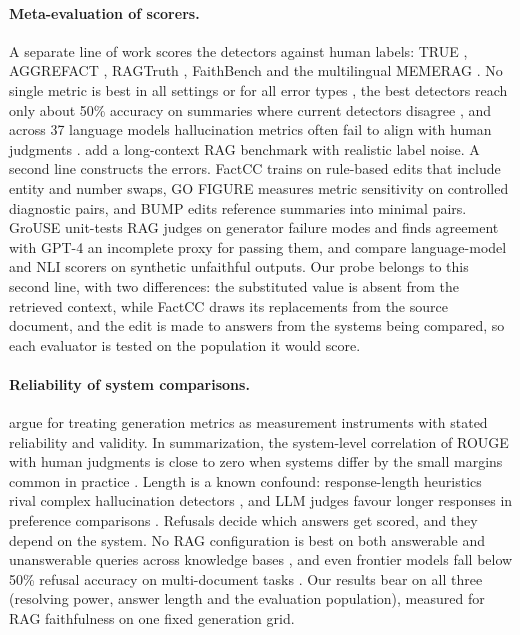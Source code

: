 \documentclass[11pt]{article}
\begin{document}
\paragraph{Meta-evaluation of scorers.}
A separate line of work scores the detectors against human labels: TRUE \citep{honovich-etal-2022}, AGGREFACT \citep{tang-etal-2023}, RAGTruth \citep{niu-etal-2024}, FaithBench \citep{bao-etal-2025} and the multilingual MEMERAG \citep{cruz-blandon-etal-2025-memerag}. No single metric is best in all settings or for all error types \citep{tang-etal-2023}, the best detectors reach only about 50\% accuracy on summaries where current detectors disagree \citep{bao-etal-2025}, and across 37 language models hallucination metrics often fail to align with human judgments \citep{kulkarni-etal-2025-evaluating}. \citet{chen-etal-2026-rethinking-evaluation} add a long-context RAG benchmark with realistic label noise. A second line constructs the errors. FactCC \citep{kryscinski-etal-2020-evaluating} trains on rule-based edits that include entity and number swaps, GO FIGURE \citep{gabriel-etal-2021-go} measures metric sensitivity on controlled diagnostic pairs, and BUMP \citep{ma-etal-2023} edits reference summaries into minimal pairs. GroUSE \citep{muller-etal-2025-grouse} unit-tests RAG judges on generator failure modes and finds agreement with \mbox{GPT-4} an incomplete proxy for passing them, and \citet{jing-etal-2025-scale} compare language-model and NLI scorers on synthetic unfaithful outputs. Our probe belongs to this second line, with two differences: the substituted value is absent from the retrieved context, while FactCC draws its replacements from the source document, and the edit is made to answers from the systems being compared, so each evaluator is tested on the population it would score.

\paragraph{Reliability of system comparisons.}
\citet{xiao-etal-2023} argue for treating generation metrics as measurement instruments with stated reliability and validity. In summarization, the system-level correlation of ROUGE with human judgments is close to zero when systems differ by the small margins common in practice \citep{deutsch-etal-2022-examining}. Length is a known confound: response-length heuristics rival complex hallucination detectors \citep{janiak-etal-2025-illusion}, and LLM judges favour longer responses in preference comparisons \citep{hu-etal-2025-explaining}. Refusals decide which answers get scored, and they depend on the system. No RAG configuration is best on both answerable and unanswerable queries across knowledge bases \citep{peng-etal-2025-unanswerability}, and even frontier models fall below 50\% refusal accuracy on multi-document tasks \citep{muhamed-etal-2026-refusalbench}. Our results bear on all three (resolving power, answer length and the evaluation population), measured for RAG faithfulness on one fixed generation grid.
\end{document}
